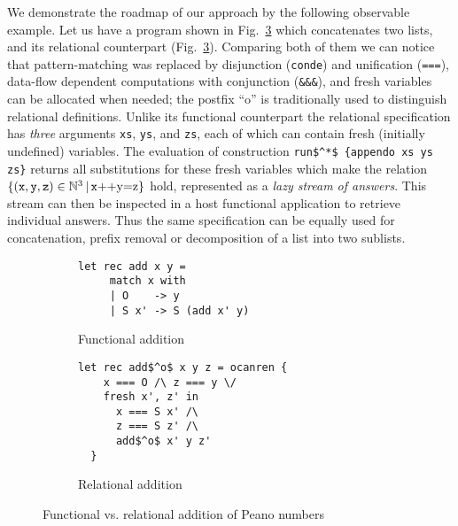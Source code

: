 We demonstrate the roadmap of our approach by the following observable example. Let us have a program
shown in Fig.~\ref{fun_vs_rel} which concatenates two lists,
and its relational counterpart (Fig.~\ref{fun_vs_rel}).
Comparing both of them we can notice that pattern-matching was replaced by disjunction (\lstinline[language=ocanren,basicstyle=\small]|conde|)
and unification (\lstinline[language=ocanren,basicstyle=\small]|===|), data-flow dependent computations with conjunction (\lstinline[language=ocanren,basicstyle=\small]|&&&|),
and fresh variables can be allocated when needed; the postfix ``o'' is traditionally used to distinguish relational definitions. 
Unlike its functional
counterpart the relational specification has \emph{three} arguments \lstinline[language=ocanren,basicstyle=\small]|xs|, \lstinline[language=ocanren,basicstyle=\small]|ys|,
and \lstinline[language=ocanren,basicstyle=\small]|zs|, each of which can contain fresh (initially undefined) variables.
The evaluation of construction \lstinline[language=ocanren,basicstyle=\small]|run$^*$ {appendo xs ys zs}| returns all substitutions for these
fresh variables which make the relation $\{(\mbox{\texttt x}, \mbox{\texttt y}, \mbox{\texttt z})\in\mathbb{N}^3\, |\, \mbox{\texttt x++y=z}\}$ hold, represented as a \emph{lazy stream of answers}. This stream can
then be inspected in a host functional application to retrieve individual answers. 
Thus the same specification can be equally used for concatenation,
prefix removal or decomposition of a list into two sublists.

\begin{figure}[t]
  \begin{subfigure}[t]{0.5\textwidth}
  \begin{lstlisting}[language=ocanren,basicstyle=\small]
   let rec add x y =
     match x with
     | O    -> y
     | S x' -> S (add x' y)
  \end{lstlisting}
  \caption{Functional addition}
  \label{funadd}
  \end{subfigure}
  \begin{subfigure}[t]{0.5\textwidth}
    \begin{lstlisting}[language=ocanren,basicstyle=\small]
  let rec add$^o$ x y z = ocanren {
    x === O /\ z === y \/
    fresh x', z' in
      x === S x' /\
      z === S z' /\
      add$^o$ x' y z'
  }
    \end{lstlisting}
    \caption{Relational addition}
    \label{reladd}
  \end{subfigure}
  \caption{Functional vs. relational addition of Peano numbers}
  \label{fun_vs_rel}
\end{figure}
